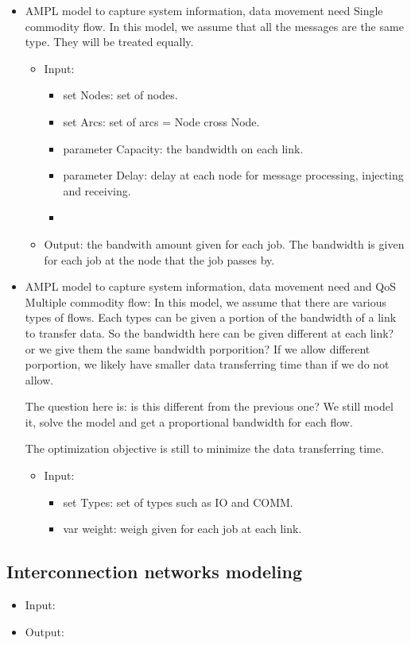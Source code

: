 \documentclass[letter]{article}
\begin{document}
\begin{itemize}
\item AMPL model to capture system information, data movement need
Single commodity flow. In this model, we assume that all the messages are the same type. They will be treated equally.
\begin{itemize}
\item Input:
\begin{itemize}
\item set Nodes: set of nodes.
\item set Arcs: set of arcs = Node cross Node.
\item parameter Capacity: the bandwidth on each link.
\item parameter Delay: delay at each node for message processing, injecting and receiving.
\item 
\end{itemize}
\item Output: the bandwith amount given for each job. The bandwidth is given for each job at the node that the job passes by. 
\end{itemize}

\item AMPL model to capture system information, data movement need and QoS 
Multiple commodity flow: In this model, we assume that there are various types of flows. Each types can be given a portion of the bandwidth of a link to transfer data. So the bandwidth here can be given different at each link? or we give them the same bandwidth porporition? If we allow different porportion, we likely have smaller data transferring time than if we do not allow.

The question here is: is this different from the previous one? We still model it, solve the model and get a proportional bandwidth for each flow.

The optimization objective is still to minimize the data transferring time.
\begin{itemize}
\item Input:
\begin{itemize}
\item set Types: set of types such as IO and COMM.
\item var weight: weigh given for each job at each link.
\end{itemize}

\end{itemize}
\end{itemize}

\subsection {Interconnection networks  modeling}
\begin{itemize}
\item Input:
\item Output:
\end{itemize}
\end{document}
